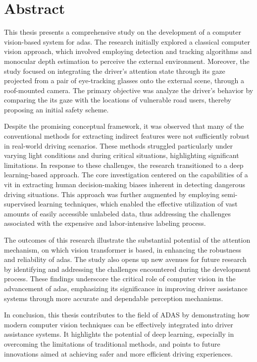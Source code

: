 \thispagestyle{empty}
\section*{Abstract}
\vspace{0.5cm}
This thesis presents a comprehensive study on the development of a computer 
vision-based system for \acf{adas}. The research 
initially explored a classical computer vision approach, which involved 
employing detection and tracking algorithms and monocular depth estimation
to perceive the external environment. Moreover, the study focused on 
integrating the driver’s attention state through its gaze projected from a pair 
of eye-tracking glasses onto the external scene, through a roof-mounted camera.
The primary objective was analyze the driver's behavior by comparing the 
its gaze with the locations of vulnerable road users, thereby proposing 
an initial safety scheme.

Despite the promising conceptual framework, it was observed that many of the 
conventional methods for extracting indirect features were not sufficiently 
robust in real-world driving scenarios. These methods struggled particularly 
under varying light conditions and during critical situations, highlighting 
significant limitations. In response to these challenges, the research 
transitioned to a deep learning-based approach. The core investigation centered 
on the capabilities of a \acf{vit} in extracting human decision-making 
biases inherent in detecting dangerous driving situations.
This approach was further augmented by 
employing semi-supervised learning techniques, which enabled the effective 
utilization of vast amounts of easily accessible unlabeled data, thus 
addressing the challenges associated with the expensive and labor-intensive 
labeling process.

The outcomes of this research illustrate the substantial potential of 
the attention mechanism, on which vision transformer is based, in enhancing 
the robustness 
and reliability of \acs{adas}. The study also opens up new avenues for future 
research by identifying and addressing the challenges encountered during the 
development process. These findings underscore the critical role of computer 
vision in the advancement of \acs{adas}, emphasizing its significance in improving 
driver assistance systems through more accurate and dependable perception 
mechanisms.

In conclusion, this thesis contributes to the field of ADAS by demonstrating 
how modern computer vision techniques can be effectively integrated into driver 
assistance systems. It highlights the potential of deep 
learning, especially in overcoming the limitations of traditional methods, and 
points to future innovations aimed at achieving safer and more 
efficient driving experiences.

\afterpage{\blankpage}
